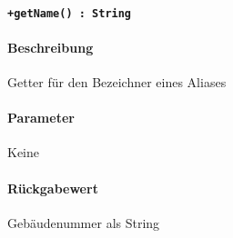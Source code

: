 \paragraph{\texttt{+getName() : String}}%
\paragraph*{Beschreibung}
Getter für den Bezeichner eines Aliases
\paragraph*{Parameter}
Keine
\paragraph*{Rückgabewert}
Gebäudenummer als String